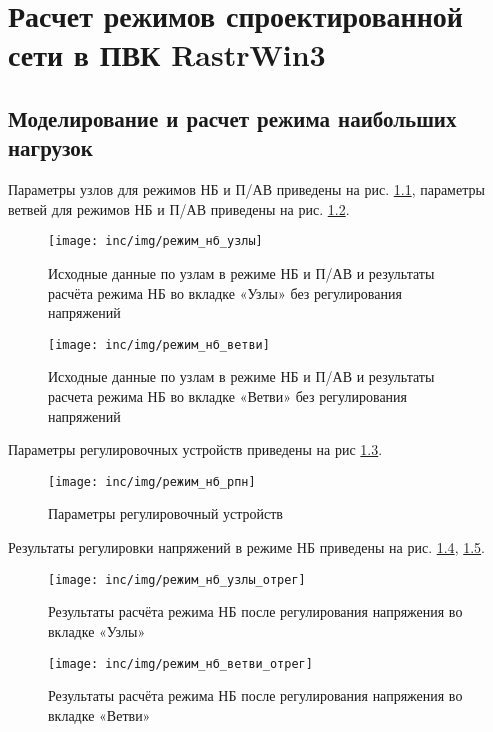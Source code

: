 \chapter{Расчет режимов спроектированной сети в ПВК RastrWin3}
\label{cha:растр_вин}

\section{Моделирование и расчет режима наибольших нагрузок}

Параметры узлов для режимов НБ и П/АВ приведены на рис. \ref{fig:узлы_нб}, параметры ветвей для режимов НБ и П/АВ приведены на рис. \ref{fig:ветви_нб}.

\begin{figure}[H]
	\centering
	\texttt{[image: inc/img/режим\_нб\_узлы]}
	\caption{Исходные данные по узлам в режиме НБ и П/АВ и результаты расчёта режима НБ во вкладке «Узлы» без регулирования напряжений}
	\label{fig:узлы_нб}
\end{figure}

\begin{figure}[H]
	\centering
	\texttt{[image: inc/img/режим\_нб\_ветви]}
	\caption{Исходные данные по узлам в режиме НБ и П/АВ и результаты расчета режима НБ во вкладке «Ветви» без регулирования напряжений}
	\label{fig:ветви_нб}
\end{figure}

Параметры регулировочных устройств приведены на рис \ref{fig:анцапфы}.

\begin{figure}[H]
	\centering
	\texttt{[image: inc/img/режим\_нб\_рпн]}
	\caption{Параметры регулировочный устройств}
	\label{fig:анцапфы}
\end{figure}

Результаты регулировки напряжений в режиме НБ приведены на рис. \ref{fig:узлы_нб_отрег}, \ref{fig:ветви_нб_отрег}.

\begin{figure}[H]
	\centering
	\texttt{[image: inc/img/режим\_нб\_узлы\_отрег]}
	\caption{Результаты расчёта режима НБ после регулирования напряжения во вкладке «Узлы»}
	\label{fig:узлы_нб_отрег}
\end{figure}

\begin{figure}[H]
	\centering
	\texttt{[image: inc/img/режим\_нб\_ветви\_отрег]}
	\caption{Результаты расчёта режима НБ после регулирования напряжения во вкладке «Ветви»}
	\label{fig:ветви_нб_отрег}
\end{figure}

